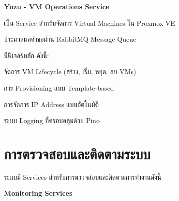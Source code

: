 \vspace{0.5em}
\textbf{Yuzu - VM Operations Service}
\vspace{0.5em}

\begin{mycustomenum2}
    \item เป็น Service สำหรับจัดการ Virtual Machines ใน Proxmox VE
    \item ประมวลผลคำขอผ่าน RabbitMQ Message Queue
    \item มีฟีเจอร์หลัก ดังนี้:
    \begin{mycustomenum2}
        \item จัดการ VM Lifecycle (สร้าง, เริ่ม, หยุด, ลบ VMs)
        \item การ Provisioning แบบ Template-based
        \item การจัดการ IP Address แบบอัตโนมัติ
        \item ระบบ Logging ที่ครอบคลุมด้วย Pino
    \end{mycustomenum2}
\end{mycustomenum2}

\section{การตรวจสอบและติดตามระบบ}
\hspace*{1.5em}
ระบบมี Services สำหรับการตรวจสอบและติดตามการทำงานดังนี้

\vspace{0.5em}
\textbf{Monitoring Services}
\vspace{0.5em}

